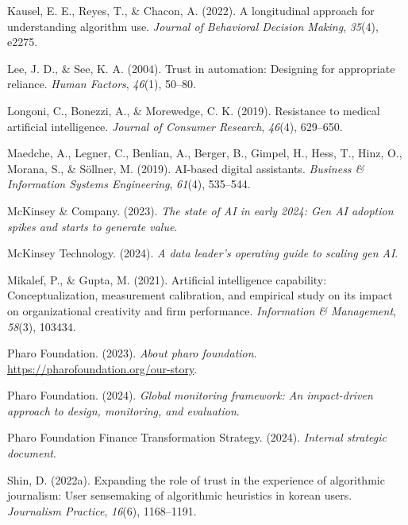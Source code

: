 \documentclass[
]{article}
\newlength{\cslhangindent}
\newenvironment{CSLReferences}[2] %
 {\begin{list}{}{%
  \setlength{\itemindent}{0pt}
  \setlength{\leftmargin}{0pt}
  \setlength{\parsep}{0pt}
  \ifodd #1
   \setlength{\leftmargin}{\cslhangindent}
   \setlength{\itemindent}{-1\cslhangindent}
  \fi
  \setlength{\itemsep}{#2\baselineskip}}}
 {\end{list}}
\begin{document}
\begin{CSLReferences}{1}{0}
Kausel, E. E., Reyes, T., \& Chacon, A. (2022). A longitudinal approach
for understanding algorithm use. \emph{Journal of Behavioral Decision
Making}, \emph{35}(4), e2275.

Lee, J. D., \& See, K. A. (2004). Trust in automation: Designing for
appropriate reliance. \emph{Human Factors}, \emph{46}(1), 50--80.

Longoni, C., Bonezzi, A., \& Morewedge, C. K. (2019). Resistance to
medical artificial intelligence. \emph{Journal of Consumer Research},
\emph{46}(4), 629--650.

Maedche, A., Legner, C., Benlian, A., Berger, B., Gimpel, H., Hess, T.,
Hinz, O., Morana, S., \& Söllner, M. (2019). AI-based digital
assistants. \emph{Business \& Information Systems Engineering},
\emph{61}(4), 535--544.

McKinsey \& Company. (2023). \emph{The state of AI in early 2024: Gen AI
adoption spikes and starts to generate value}.

McKinsey Technology. (2024). \emph{A data leader's operating guide to
scaling gen AI}.

Mikalef, P., \& Gupta, M. (2021). Artificial intelligence capability:
Conceptualization, measurement calibration, and empirical study on its
impact on organizational creativity and firm performance.
\emph{Information \& Management}, \emph{58}(3), 103434.

Pharo Foundation. (2023). \emph{About pharo foundation}.
\url{https://pharofoundation.org/our-story}.

Pharo Foundation. (2024). \emph{Global monitoring framework: An
impact-driven approach to design, monitoring, and evaluation}.

Pharo Foundation Finance Transformation Strategy. (2024). \emph{Internal
strategic document}.

Shin, D. (2022a). Expanding the role of trust in the experience of
algorithmic journalism: User sensemaking of algorithmic heuristics in
korean users. \emph{Journalism Practice}, \emph{16}(6), 1168--1191.


\end{CSLReferences}
\end{document}

